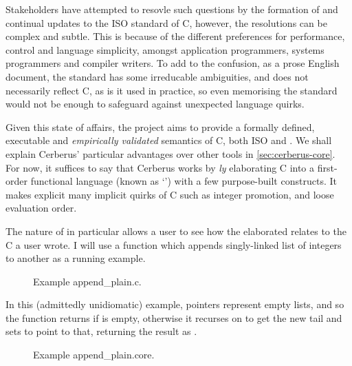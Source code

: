 Stakeholders have attempted to resovle such questions by the formation of and
continual updates to the ISO standard of C\cite{isoC1990}, however, the
resolutions can be complex and subtle. This is because of the different
preferences for performance, control and language simplicity, amongst
application programmers, systems programmers and compiler writers. To add to
the confusion, as a prose English document, the standard has some irreducable
ambiguities, and does not necessarily reflect  C, as is it
used in practice, so even memorising the standard would not be enough to
safeguard against unexpected language quirks.

Given this state of affairs, the  project aims to provide a
formally defined, executable and \emph{empirically validated} semantics of C,
both ISO and . We shall explain Cerberus' particular advantages
over other tools in \cref{sec:cerberus-core}. For now, it suffices to say that
Cerberus works by \emph{ly} elaborating C into a first-order
functional language (known as `') with a few purpose-built
constructs. It makes explicit many implicit quirks of C such as integer
promotion,  and loose evaluation order.

The  nature of in particular allows a user to see how the
elaborated  relates to the C a user wrote. I will use a function which
appends singly-linked list of integers to another as a running example.

\begin{figure}[h]
\centering
{}
\caption{Example append\_plain.c.}\label{fig:append-c}
\end{figure}%

In this (admittedly unidiomatic) example,  pointers represent
empty lists, and so the function returns  if  is empty,
otherwise it recurses on  to get the new tail
 and sets  to point to that,  returning the
result as .

\begin{figure}[h]
\centering
{}
\caption{Example append\_plain.core.}\label{fig:append-core}
\end{figure}%

